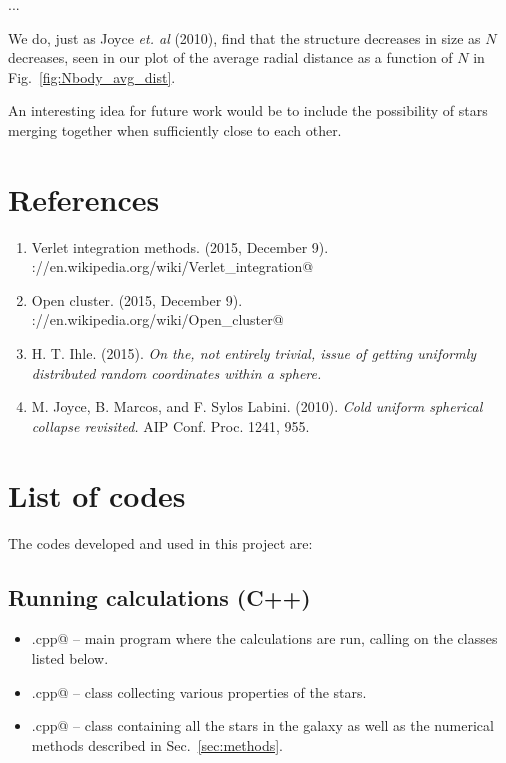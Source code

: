 \documentclass{article}
\begin{document}
\begin{multicols}{2}
...

We do, just as Joyce \textit{et. al} (2010), find that the structure decreases in size as $N$ decreases, seen in our plot of the average radial distance as a function of $N$ in Fig.~\ref{fig:Nbody_avg_dist}.

An interesting idea for future work would be to include the possibility of stars merging together when sufficiently close to each other.

\section{References}

\begin{enumerate}
	\item Verlet integration methods. (2015, December 9). \\ \verb@https://en.wikipedia.org/wiki/Verlet_integration@
	\item Open cluster. (2015, December 9). \\ \verb@https://en.wikipedia.org/wiki/Open_cluster@
	\item H. T. Ihle. (2015). \textit{On the, not entirely trivial, issue of getting uniformly distributed random coordinates within a sphere.} 
	\item M. Joyce, B. Marcos, and F. Sylos Labini. (2010). \textit{Cold uniform spherical collapse revisited.} AIP Conf. Proc. 1241, 955.
\end{enumerate}



\section{List of codes}

The codes developed and used in this project are: 


\subsection{Running calculations (C++)}

\begin{itemize}
	\item \verb@main.cpp@ -- main program where the calculations are run, calling on the classes listed below. 
	\item \verb@star.cpp@ -- class collecting various properties of the stars.
	\item \verb@galaxy.cpp@ -- class containing all the stars in the galaxy as well as the numerical methods described in Sec.~\ref{sec:methods}.
\end{itemize}



\end{multicols}
\end{document}
